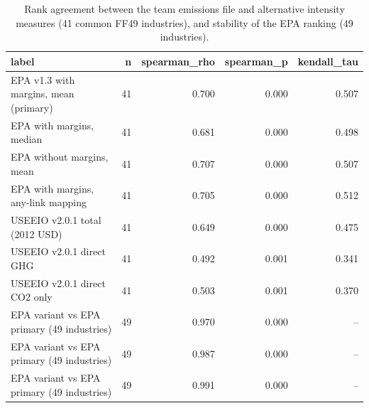 \begin{table}
\caption{Rank agreement between the team emissions file and alternative intensity measures (41 common FF49 industries), and stability of the EPA ranking (49 industries).}
\label{tab:m4_spearman}
\begin{tabular}{lrrrr}
\toprule
label & n & spearman\_rho & spearman\_p & kendall\_tau \\
\midrule
EPA v1.3 with margins, mean (primary) & 41 & 0.700 & 0.000 & 0.507 \\
EPA with margins, median & 41 & 0.681 & 0.000 & 0.498 \\
EPA without margins, mean & 41 & 0.707 & 0.000 & 0.507 \\
EPA with margins, any-link mapping & 41 & 0.705 & 0.000 & 0.512 \\
USEEIO v2.0.1 total (2012 USD) & 41 & 0.649 & 0.000 & 0.475 \\
USEEIO v2.0.1 direct GHG & 41 & 0.492 & 0.001 & 0.341 \\
USEEIO v2.0.1 direct CO2 only & 41 & 0.503 & 0.001 & 0.370 \\
EPA variant vs EPA primary (49 industries) & 49 & 0.970 & 0.000 & -- \\
EPA variant vs EPA primary (49 industries) & 49 & 0.987 & 0.000 & -- \\
EPA variant vs EPA primary (49 industries) & 49 & 0.991 & 0.000 & -- \\
\bottomrule
\end{tabular}
\end{table}
